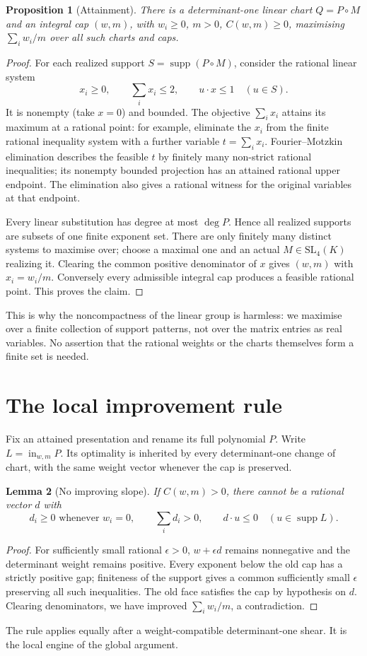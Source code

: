 \documentclass[11pt,a4paper]{article}
\newtheorem{proposition}{Proposition}
\newtheorem{lemma}[proposition]{Lemma}
\newcommand{\supp}{\operatorname{supp}}
\newcommand{\inw}{\operatorname{in}}
\begin{document}
\begin{proposition}[Attainment]\label{prop:attain}
There is a determinant-one linear chart $Q=P\circ M$ and an integral cap $(w,m)$, with $w_i\ge0$, $m>0$, $C(w,m)\ge0$, maximising $\sum_i w_i/m$ over all such charts and caps.
\end{proposition}
\begin{proof}
For each realized support $S=\supp(P\circ M)$, consider the rational linear system
\[
 x_i\ge0,\qquad \sum_i x_i\le2,\qquad
 u\cdot x\le1\quad(u\in S).
\]
It is nonempty (take $x=0$) and bounded. The objective $\sum_i x_i$ attains its maximum at a rational point: for example, eliminate the $x_i$ from the finite rational inequality system with a further variable $t=\sum_i x_i$. Fourier--Motzkin elimination describes the feasible $t$ by finitely many non-strict rational inequalities; its nonempty bounded projection has an attained rational upper endpoint. The elimination also gives a rational witness for the original variables at that endpoint.

Every linear substitution has degree at most $\deg P$. Hence all realized supports are subsets of one finite exponent set. There are only finitely many distinct systems to maximise over; choose a maximal one and an actual $M\in\mathrm{SL}_4(K)$ realizing it. Clearing the common positive denominator of $x$ gives $(w,m)$ with $x_i=w_i/m$. Conversely every admissible integral cap produces a feasible rational point. This proves the claim.
\end{proof}

This is why the noncompactness of the linear group is harmless: we maximise over a finite collection of support patterns, not over the matrix entries as real variables. No assertion that the rational weights or the charts themselves form a finite set is needed.

\section{The local improvement rule}
Fix an attained presentation and rename its full polynomial $P$. Write $L=\inw_{w,m}P$. Its optimality is inherited by every determinant-one change of chart, with the same weight vector whenever the cap is preserved.

\begin{lemma}[No improving slope]\label{lem:slope}
If $C(w,m)>0$, there cannot be a rational vector $d$ with
\[
 d_i\ge0\text{ whenever }w_i=0,\qquad
 \sum_i d_i>0,\qquad d\cdot u\le0\quad(u\in\supp L).
\]
\end{lemma}
\begin{proof}
For sufficiently small rational $\epsilon>0$, $w+\epsilon d$ remains nonnegative and the determinant weight remains positive. Every exponent below the old cap has a strictly positive gap; finiteness of the support gives a common sufficiently small $\epsilon$ preserving all such inequalities. The old face satisfies the cap by hypothesis on $d$. Clearing denominators, we have improved $\sum_i w_i/m$, a contradiction.
\end{proof}
The rule applies equally after a weight-compatible determinant-one shear. It is the local engine of the global argument.
\end{document}
